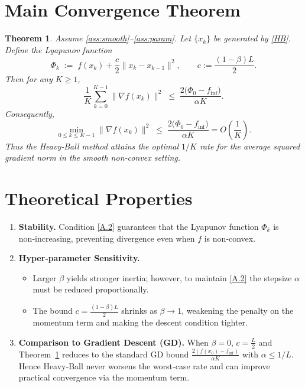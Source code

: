 \documentclass{article}
\newtheorem{theorem}{Theorem}[section]
\begin{document}
\section*{Main Convergence Theorem}
\begin{theorem}\label{thm:main}
Assume \ref{ass:smooth}–\ref{ass:param}. Let $\{x_k\}$ be generated by
\eqref{HB}. Define the Lyapunov function
\[
\Phi_k \;:=\; f(x_k)+\frac{c}{2}\|x_k-x_{k-1}\|^{2},
\qquad
c:=\frac{(1-\beta)L}{2}.
\]
Then for any $K\ge 1$,
\begin{equation}
\frac{1}{K}\sum_{k=0}^{K-1}\|\nabla f(x_k)\|^{2}
\;\le\;
\frac{2\bigl(\Phi_0-f_{\inf}\bigr)}{\alpha K}.
\tag{T.1}
\end{equation}
Consequently,
\[
\min_{0\le k\le K-1}\|\nabla f(x_k)\|^{2}
\;\le\;
\frac{2\bigl(\Phi_0-f_{\inf}\bigr)}{\alpha K}
=O\!\left(\frac{1}{K}\right).
\]
Thus the Heavy‑Ball method attains the optimal $1/K$ rate for the
average squared gradient norm in the smooth non‑convex setting.
\end{theorem}

\section*{Theoretical Properties}
\begin{enumerate}[label=\arabic*.]
\item \textbf{Stability.} Condition \eqref{A.2} guarantees that the
Lyapunov function $\Phi_k$ is non‑increasing, preventing divergence
even when $f$ is non‑convex.

\item \textbf{Hyper‑parameter Sensitivity.}
\begin{itemize}
\item Larger $\beta$ yields stronger inertia; however, to maintain
\eqref{A.2} the stepsize $\alpha$ must be reduced proportionally.
\item The bound $c=\frac{(1-\beta)L}{2}$ shrinks as $\beta\to1$, weakening the
penalty on the momentum term and making the descent condition tighter.
\end{itemize}

\item \textbf{Comparison to Gradient Descent (GD).}
When $\beta=0$, $c=\frac{L}{2}$ and Theorem~\ref{thm:main} reduces to the
standard GD bound
$\frac{2(f(x_0)-f_{\inf})}{\alpha K}$ with $\alpha\le 1/L$.
Hence Heavy‑Ball never worsens the worst‑case rate and can improve
practical convergence via the momentum term.
\end{enumerate}
\end{document}
